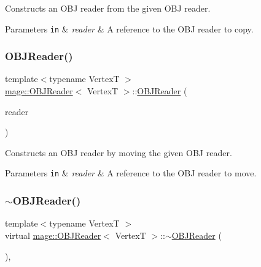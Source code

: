 Constructs an O\+BJ reader from the given O\+BJ reader.


\begin{DoxyParams}[1]{Parameters}
\mbox{\tt in}  & {\em reader} & A reference to the O\+BJ reader to copy. \\
\hline
\end{DoxyParams}
\hypertarget{classmage_1_1_o_b_j_reader_ab25803656fb224d94227c1c121c733ee}{}\label{classmage_1_1_o_b_j_reader_ab25803656fb224d94227c1c121c733ee} 
\subsubsection{\texorpdfstring{O\+B\+J\+Reader()}{OBJReader()}\hspace{0.1cm}{\footnotesize\ttfamily [3/3]}}
{\footnotesize\ttfamily template$<$typename VertexT $>$ \\
\hyperlink{classmage_1_1_o_b_j_reader}{mage\+::\+O\+B\+J\+Reader}$<$ VertexT $>$\+::\hyperlink{classmage_1_1_o_b_j_reader}{O\+B\+J\+Reader} (\begin{DoxyParamCaption}\item[{\hyperlink{classmage_1_1_o_b_j_reader}{O\+B\+J\+Reader}$<$ VertexT $>$ \&\&}]{reader }\end{DoxyParamCaption})\hspace{0.3cm}{\ttfamily [delete]}}

Constructs an O\+BJ reader by moving the given O\+BJ reader.


\begin{DoxyParams}[1]{Parameters}
\mbox{\tt in}  & {\em reader} & A reference to the O\+BJ reader to move. \\
\hline
\end{DoxyParams}
\hypertarget{classmage_1_1_o_b_j_reader_ad6087ff608be5a45559957a076f910e2}{}\label{classmage_1_1_o_b_j_reader_ad6087ff608be5a45559957a076f910e2} 
\subsubsection{\texorpdfstring{$\sim$\+O\+B\+J\+Reader()}{~OBJReader()}}
{\footnotesize\ttfamily template$<$typename VertexT $>$ \\
virtual \hyperlink{classmage_1_1_o_b_j_reader}{mage\+::\+O\+B\+J\+Reader}$<$ VertexT $>$\+::$\sim$\hyperlink{classmage_1_1_o_b_j_reader}{O\+B\+J\+Reader} (\begin{DoxyParamCaption}{ }\end{DoxyParamCaption})\hspace{0.3cm}{\ttfamily [virtual]}, {\ttfamily [default]}}


